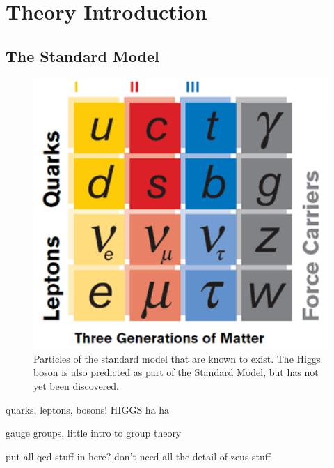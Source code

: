 \chapter{Theory Introduction}  %
\label{theory}

\section{The Standard Model}
\label{theory:SM}


 \begin{figure}[htb]
  \begin{center}
    \includegraphics[width=360pt]{Figures/theory-standard-model-symmetry-mag.png}
  \end{center}
  \caption[Particles of the standard model]
	  {Particles of the standard model that are known to exist. 
	    The Higgs boson is also predicted as part of the 
	    Standard Model, 
	    but has not yet been discovered. 
	    }
  \label{fig:StandardModel}
 \end{figure}


quarks, leptons, bosons!  HIGGS ha ha

gauge groups, little intro to group theory

put all qcd stuff in here?  don't need all the detail of zeus stuff

